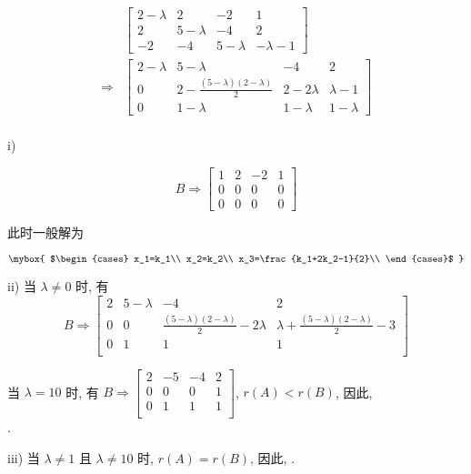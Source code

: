 $$
\begin{aligned}
    &\left[\begin{array}{ccc|c}
        2-\lambda&2&-2&1\\
        2&5-\lambda&-4&2\\
        -2&-4&5-\lambda&-\lambda-1
    \end{array}\right]\\
    \Rightarrow&
    \left[\begin{array}{ccc|c}
        2-\lambda&5-\lambda&-4&2\\
        0&2-\frac{(5-\lambda)(2-\lambda)}{2}&2-2\lambda&\lambda-1\\
        0&1-\lambda&1-\lambda&1-\lambda
    \end{array}\right]\\
\end{aligned}
$$

i)   

$$
B\Rightarrow\begin{bmatrix}
    1&2&-2&1\\0&0&0&0\\0&0&0&0
\end{bmatrix}
$$

此时一般解为

$$
\mybox{
$\begin{cases}
    x_1=k_1\\
    x_2=k_2\\
    x_3=\frac{k_1+2k_2-1}{2}\\
\end{cases}$
}
$$

ii) 当 $\lambda\not =0$ 时, 有
$$
B\Rightarrow\begin{bmatrix}
    2&5-\lambda&-4&2\\
    0&0&\frac{(5-\lambda)(2-\lambda)}{2}-2\lambda&\lambda+\frac{(5-\lambda)(2-\lambda)}{2}-3\\
    0&1&1&1\\
\end{bmatrix}
$$

当 $\lambda=10$ 时, 有 
$B\Rightarrow
\begin{bmatrix}
    2&-5&-4&2\\0&0&0&1\\0&1&1&1\\
\end{bmatrix}$,
$r(A)<r(B)$, 因此, \\
.

iii) 当 $\lambda\not=1$ 且 $\lambda\not=10$ 时, $r(A)=r(B)$, 因此, .

\vspace{12pt}